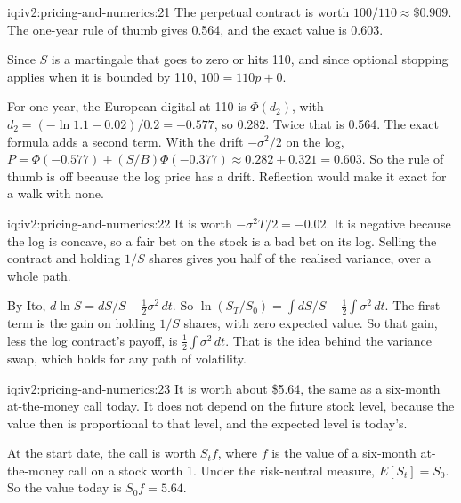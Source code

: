 \begin{solution}{iq:iv2:pricing-and-numerics:21}
The perpetual contract is worth $100/110 \approx \$0.909$. The one-year rule of thumb gives 0.564, and the exact value is 0.603.

Since $S$ is a martingale that goes to zero or hits 110, and since optional stopping applies when it is bounded by 110, $100 = 110p + 0$.

For one year, the European digital at 110 is $\Phi(d_2)$, with $d_2 = (-\ln 1.1 - 0.02)/0.2 = -0.577$, so 0.282. Twice that is 0.564. The exact formula adds a second term. With the drift $-\sigma^2/2$ on the log, $P = \Phi(-0.577) + (S/B)\Phi(-0.377) \approx 0.282 + 0.321 = 0.603$. So the rule of thumb is off because the log price has a drift. Reflection would make it exact for a walk with none.

\end{solution}

\begin{solution}{iq:iv2:pricing-and-numerics:22}
It is worth $-\sigma^2T/2 = -0.02$. It is negative because the log is concave, so a fair bet on the stock is a bad bet on its log. Selling the contract and holding $1/S$ shares gives you half of the realised variance, over a whole path.

By Ito, $d\ln S = dS/S - \tfrac12\sigma^2\,dt$. So $\ln(S_T/S_0) = \int dS/S - \tfrac12\int\sigma^2\,dt$. The first term is the gain on holding $1/S$ shares, with zero expected value. So that gain, less the log contract's payoff, is $\tfrac12\int\sigma^2\,dt$. That is the idea behind the variance swap, which holds for any path of volatility.

\end{solution}

\begin{solution}{iq:iv2:pricing-and-numerics:23}
It is worth about \$5.64, the same as a six-month at-the-money call today. It does not depend on the future stock level, because the value then is proportional to that level, and the expected level is today's.

At the start date, the call is worth $S_tf$, where $f$ is the value of a six-month at-the-money call on a stock worth 1. Under the risk-neutral measure, $E[S_t] = S_0$. So the value today is $S_0f = 5.64$.

\end{solution}

